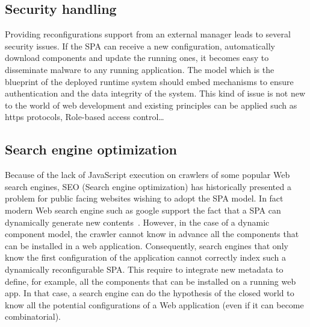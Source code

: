 \subsection{Security handling}
Providing reconfigurations support from an external manager leads to several security issues.
If the SPA can receive a new configuration, automatically download components and update the running ones, it becomes easy to disseminate malware to any running application.
The model which is the blueprint of the deployed runtime system should embed mechanisms to ensure authentication and the data integrity of the system.
This kind of issue is not new to the world of web development and existing principles can be applied such as https protocols, Role-based access control\dots

\subsection{Search engine optimization}
Because of the lack of JavaScript execution on crawlers of some popular Web search engines, SEO (Search engine optimization) has historically presented a problem for public facing websites wishing to adopt the SPA model. In fact modern Web search engine such as google support the fact that a SPA can dynamically generate new contents~\cite{googlesearch}. However, in the case of a dynamic component model, the crawler cannot know in advance all the components that can be installed in a web application. Consequently, search engines that only know the first configuration of the application cannot correctly index such a dynamically reconfigurable SPA. This require to integrate new metadata to define, for example, all the components that can be installed on a running web app. In that case, a search engine can do the hypothesis of the closed world to know all the potential configurations of a Web application (even if it can become combinatorial).

